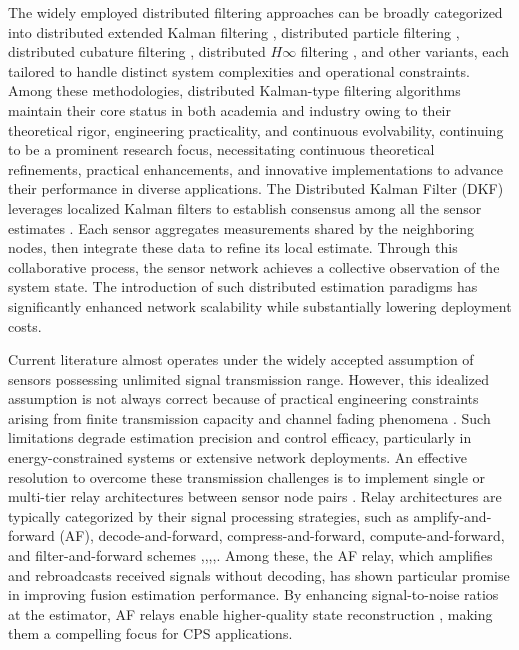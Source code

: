 \documentclass[twocolumn]{IEEEtran}
\begin{document}
The widely employed distributed filtering approaches can be broadly categorized into distributed extended Kalman filtering \cite{shen2023distributed, chen2022information}, distributed particle filtering \cite{xia2020direct, liu2023mesh}, distributed cubature filtering \cite{zhou2024robust}, distributed $H\infty$ filtering \cite{ding2015distributed}, and other variants, each tailored to handle distinct system complexities and operational constraints. Among these methodologies, distributed Kalman-type filtering algorithms maintain their core status in both academia and industry owing to their theoretical rigor, engineering practicality, and continuous evolvability, continuing to be a prominent research focus, necessitating continuous theoretical refinements, practical enhancements, and innovative implementations to advance their performance in diverse applications. The Distributed Kalman Filter (DKF) leverages localized Kalman filters to establish consensus among all the sensor estimates \cite{olfati2007distributed,olfati2005distributed}. Each sensor aggregates measurements shared by the neighboring nodes, then integrate these data to refine its local estimate. Through this collaborative process, the sensor network achieves a collective observation of the system state. The introduction of such distributed estimation paradigms has significantly enhanced network scalability while substantially lowering deployment costs.

Current literature almost operates under the widely accepted assumption of sensors possessing unlimited signal transmission range. However, this idealized assumption is not always correct because of practical engineering constraints arising from finite transmission capacity and channel fading phenomena \cite{li2022event, liu2021distributed}. Such limitations degrade estimation precision and control efficacy, particularly in energy-constrained systems or extensive network deployments. An effective resolution to overcome these transmission challenges is to implement single or multi-tier relay architectures between sensor node pairs \cite{ behbahani2012linear, lloyd2006relay, leong2015kalman, khajehnouri2007distributed, tan2020robust, sahebdel2011relay}. Relay architectures are typically categorized by their signal processing strategies, such as amplify-and-forward (AF), decode-and-forward, compress-and-forward, compute-and-forward, and filter-and-forward schemes \cite{liu2022auxiliary},\cite{lloyd2006relay},\cite{pang2021false},\cite{qu2022probabilistic},\cite{quevedo2012state}. Among these, the AF relay, which amplifies and rebroadcasts received signals without decoding, has shown particular promise in improving fusion estimation performance. By enhancing signal-to-noise ratios at the estimator, AF relays enable higher-quality state reconstruction \cite{han2023recursive}, making them a compelling focus for CPS applications.
\end{document}
